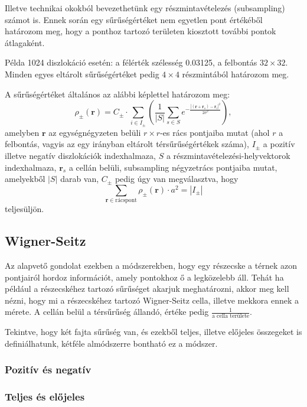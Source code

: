 \documentclass[10pt,a4paper]{scrartcl}
\let\mathbf\bm
\begin{document}
Illetve technikai okokból bevezethetünk egy részmintavételezés (subsampling) számot is. Ennek során egy sűrűségértéket nem egyetlen pont értékéből határozom meg, hogy a ponthoz tartozó területen kiosztott további pontok átlagaként.

Példa 1024 diszlokáció esetén: a félérték szélesség 0.03125, a felbontás $32\times 32$. Minden egyes eltárolt sűrűségértéket pedig $4\times 4$ részmintából határozom meg.

A sűrűségértéket általános az alábbi képlettel határozom meg:
\[{\rho _ \pm }\left( {\mathbf{r}} \right) = {C_ \pm } \cdot \sum\limits_{i \in {I_ \pm }} {\left( {\frac{1}{{\left| S \right|}}\sum\limits_{s \in S} {{e^{ - \frac{{{{\left| {\left( {{\mathbf{r}} + {{\mathbf{r}}_s}} \right) - {{\mathbf{r}}_i}} \right|}^2}}}{{2{\sigma ^2}}}}}} } \right)} ,\]
amelyben ${\mathbf{r}}$ az egységnégyzeten belüli $r\times r$-es rács pontjaiba mutat (ahol $r$ a felbontás, vagyis az egy irányban eltárolt térsűrűségértékek száma), $I_\pm$ a pozitív illetve negatív diszlokációk indexhalmaza, $S$ a részmintavételezési-helyvektorok indexhalmaza, ${{\mathbf{r}}_s}$ a cellán belüli, subsampling négyzetrács pontjaiba mutat, amelyekből ${\left| S \right|}$ darab van, ${C_ \pm }$ pedig úgy van megválasztva, hogy \[\sum\limits_{{\mathbf{r}} \in {\text{rácspont}}} {{\rho _ \pm }\left( {\mathbf{r}} \right) \cdot {a^2}}  = \left| {{I_ \pm }} \right|\]
teljesüljön.

\subsection{Wigner-Seitz}
Az alapvető gondolat ezekben a módszerekben, hogy egy részecske a térnek azon pontjairól hordoz információt, amely pontokhoz ő a legközelebb áll. Tehát ha például a részecskéhez tartozó sűrűséget akarjuk meghatározni, akkor meg kell nézni, hogy mi a részecskéhez tartozó Wigner-Seitz cella, illetve mekkora ennek a mérete. A cellán belül a térsűrűség állandó, értéke pedig $\frac{1}{\text{a cella területe}}$.

Tekintve, hogy két fajta sűrűség van, és ezekből teljes, illetve előjeles összegeket is definiálhatunk, kétféle almódszerre bontható ez a módszer.

\subsubsection{Pozitív és negatív}
\subsubsection{Teljes és előjeles}
\end{document}
